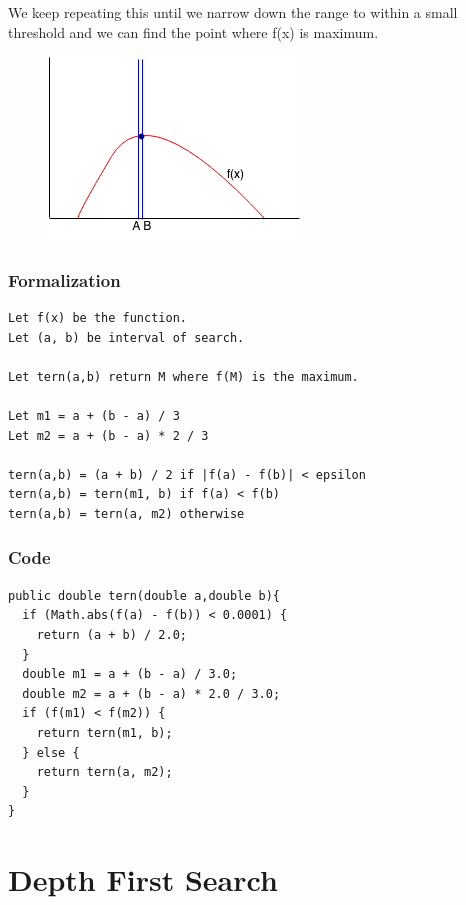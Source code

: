 \documentclass[11pt,oneside]{book}
\makeatletter
\def\maxwidth#1{\ifdim\Gin@nat@width>#1 #1\else\Gin@nat@width\fi}
\makeatother
\begin{document}
We keep repeating this until we narrow down the range to within a small threshold and we can find the point where f(x) is maximum.

\vspace{5px}\begin{figure}[H]\centering
        \includegraphics[width=0.66\maxwidth{\textwidth}]{ternarysearch7.png}
        \end{figure}

\subsubsection{Formalization}

\begin{lstlisting}
Let f(x) be the function.
Let (a, b) be interval of search.

Let tern(a,b) return M where f(M) is the maximum.

Let m1 = a + (b - a) / 3
Let m2 = a + (b - a) * 2 / 3

tern(a,b) = (a + b) / 2 if |f(a) - f(b)| < epsilon
tern(a,b) = tern(m1, b) if f(a) < f(b)
tern(a,b) = tern(a, m2) otherwise
\end{lstlisting}

\subsubsection{Code}

\begin{lstlisting}
public double tern(double a,double b){
  if (Math.abs(f(a) - f(b)) < 0.0001) {
    return (a + b) / 2.0;
  }
  double m1 = a + (b - a) / 3.0;
  double m2 = a + (b - a) * 2.0 / 3.0;
  if (f(m1) < f(m2)) {
    return tern(m1, b);
  } else {
    return tern(a, m2);
  }
}
\end{lstlisting}

        \section{ Depth First Search }
        
\end{document}
